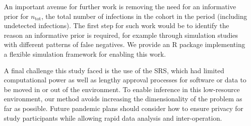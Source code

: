 \documentclass[referee,useAMS,usenatbib]{biom}
\newcommand{\psens}{p_\text{sens}}
\newcommand{\ntot}{n_\text{tot}}
\begin{document}
An important avenue for further work is removing the need for an informative prior for $\ntot$, the total number of infections in the cohort in the period (including undetected infections).
The first step for such work would be to identify the reason an informative prior is required, for example through simulation studies with different patterns of false negatives.
We provide an R package implementing a flexible simulation framework for enabling this work.

A final challenge this study faced is the use of the SRS, which had limited computational power as well as lengthy approval processes for software or data to be moved in or out of the environment.
To enable inference in this low-resource environment, our method avoids increasing the dimensionality of the problem as far as possible.
Future pandemic plans should consider how to ensure privacy for study participants while allowing rapid data analysis and inter-operation.


    
    
\end{document}
